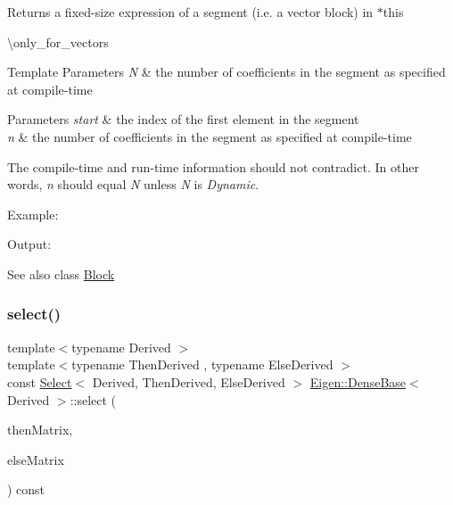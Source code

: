 \begin{DoxyReturn}{Returns}
a fixed-\/size expression of a segment (i.\+e. a vector block) in {\ttfamily $\ast$this} 
\end{DoxyReturn}
\textbackslash{}only\+\_\+for\+\_\+vectors


\begin{DoxyTemplParams}{Template Parameters}
{\em N} & the number of coefficients in the segment as specified at compile-\/time \\
\hline
\end{DoxyTemplParams}

\begin{DoxyParams}{Parameters}
{\em start} & the index of the first element in the segment \\
\hline
{\em n} & the number of coefficients in the segment as specified at compile-\/time\\
\hline
\end{DoxyParams}
The compile-\/time and run-\/time information should not contradict. In other words, {\itshape n} should equal {\itshape N} unless {\itshape N} is {\itshape Dynamic}.

Example\+: 
\begin{DoxyCodeInclude}{0}
\end{DoxyCodeInclude}
 Output\+: 
\begin{DoxyVerbInclude}
\end{DoxyVerbInclude}


\begin{DoxySeeAlso}{See also}
class \mbox{\hyperlink{class_eigen_1_1_block}{Block}} 
\end{DoxySeeAlso}
\mbox{\label{class_eigen_1_1_dense_base_a65e78cfcbc9852e6923bebff4323ddca}} 
\subsubsection{\texorpdfstring{select()}{select()}\hspace{0.1cm}{\footnotesize\ttfamily [1/3]}}
{\footnotesize\ttfamily template$<$typename Derived $>$ \\
template$<$typename Then\+Derived , typename Else\+Derived $>$ \\
const \mbox{\hyperlink{class_eigen_1_1_select}{Select}}$<$ Derived, Then\+Derived, Else\+Derived $>$ \mbox{\hyperlink{class_eigen_1_1_dense_base}{Eigen\+::\+Dense\+Base}}$<$ Derived $>$\+::select (\begin{DoxyParamCaption}\item[{const \mbox{\hyperlink{class_eigen_1_1_dense_base}{Dense\+Base}}$<$ Then\+Derived $>$ \&}]{then\+Matrix,  }\item[{const \mbox{\hyperlink{class_eigen_1_1_dense_base}{Dense\+Base}}$<$ Else\+Derived $>$ \&}]{else\+Matrix }\end{DoxyParamCaption}) const\hspace{0.3cm}{\ttfamily [inline]}}

